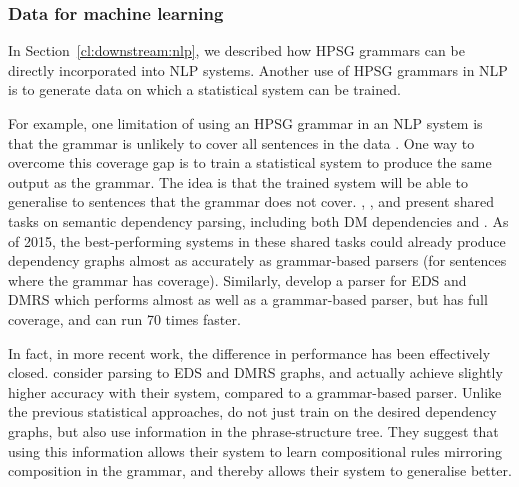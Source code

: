 \documentclass[output=paper,nonflat]{langsci/langscibook}
\begin{document}
\subsubsection{Data for machine learning}
\label{cl:downstream:data}


In Section~\ref{cl:downstream:nlp},
we described how HPSG grammars can be directly incorporated into NLP systems.
Another use of HPSG grammars in NLP
is to generate data on which a statistical system can be trained.

For example, one limitation of using an HPSG grammar in an NLP system
is that the grammar is unlikely to cover all sentences in the data \citep{flickinger2012deepbank}.
One way to overcome this coverage gap
is to train a statistical system to produce the same output as the grammar.
The idea is that the trained system will be able to generalise to sentences that the grammar does not cover.
\citet{oepen2014semeval}, \citet{oepen2015semeval}, and \citet{Oep:Abe:Haj:19}
present shared tasks on semantic dependency parsing,
including both DM dependencies and  .
As of 2015, the best-performing systems in these shared tasks
could already produce dependency graphs almost as accurately as grammar-based parsers (for sentences where the grammar has coverage).
Similarly, \citet{buys2017parse} develop a parser for EDS and DMRS
which performs almost as well as a grammar-based parser,
but has full coverage, and can run 70 times faster.

In fact, in more recent work, the difference in performance has been effectively closed.
\citet{chen2018parse} consider parsing to EDS and DMRS graphs,
and actually achieve slightly higher accuracy with their system,
compared to a grammar-based parser.
Unlike the previous statistical approaches,
\citeauthor{chen2018parse} do not just train on the desired dependency graphs,
but also use information in the phrase-structure tree.
They suggest that using this information allows their system
to learn compositional rules mirroring composition in the grammar,
and thereby allows their system to generalise better.
\end{document}
